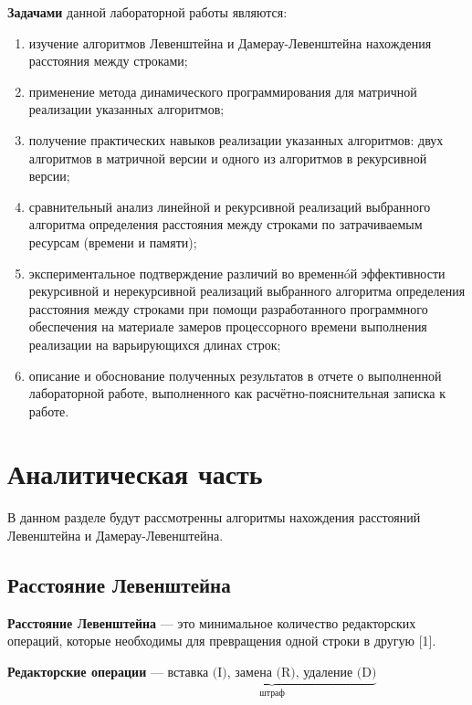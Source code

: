 \documentclass[a4paper,12pt]{article}
\begin{document}
\textbf{Задачами} данной лабораторной работы являются:
\begin{enumerate} 
	\item изучение алгоритмов Левенштейна и Дамерау-Левенштейна нахождения расстояния между строками;
	\item применение метода динамического программирования для матричной реализации указанных алгоритмов;
	\item получение практических навыков реализации указанных алгоритмов: двух алгоритмов в матричной версии и одного из алгоритмов в рекурсивной версии;
	\item сравнительный анализ линейной и рекурсивной реализаций выбранного алгоритма определения расстояния между строками по затрачиваемым ресурсам (времени и памяти);
	\item экспериментальное подтверждение различий во временнóй эффективности рекурсивной и нерекурсивной реализаций выбранного алгоритма определения расстояния между строками при помощи разработанного программного обеспечения на материале замеров процессорного времени выполнения реализации на варьирующихся длинах строк;
	\item описание и обоснование полученных результатов в отчете о выполненной лабораторной работе, выполненного как расчётно-пояснительная записка к работе.
\end{enumerate}

\clearpage

\section{Аналитическая часть}%

\vspace{\baselineskip}
В данном разделе будут рассмотренны алгоритмы нахождения расстояний Левенштейна и Дамерау-Левенштейна.

\subsection{Расстояние Левенштейна}%

\vspace{\baselineskip}

\textbf{Расстояние Левенштейна} — это минимальное количество редакторских операций, которые необходимы для превращения одной строки в другую [1].
\vspace{\baselineskip}\newline

\textbf{Редакторские операции} — $\underbrace{\text{вставка (I), замена (R), удаление (D)}}_{\text{штраф}}$
\vspace{\baselineskip}\newline
\end{document}
